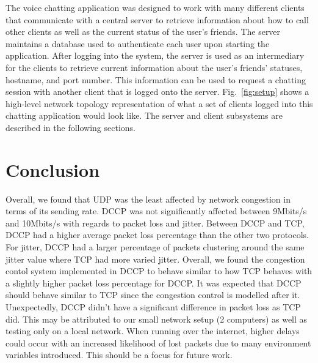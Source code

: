 \documentclass[letterpaper, 9 pt, balance, conference]{ieeeconf}
\begin{document}
The voice chatting application was designed to work with many different clients
that communicate with a central server to retrieve information about how to call
other clients as well as the current status of the user's friends. The server 
maintains a database used to authenticate each user upon starting the application.
After logging into the system, the server is used as an intermediary for the clients
to retrieve current information about the user's friends' statuses, hostname, and
port number. This information can be used to request a chatting session with another
client that is logged onto the server.  Fig.~\ref{fig:setup} shows a high-level
network topology representation of what a set of clients logged into this chatting 
application would look like.  The server and client subsystems are described in
the following sections.







\section{Conclusion}
\label{sec:concl}

Overall, we found that UDP was the least affected by network congestion in terms of its sending rate.  DCCP was not 
significantly affected between 9Mbits/s and 10Mbits/s with regards to packet loss and 
jitter.  Between DCCP and TCP, DCCP had a higher average packet loss 
percentage than the other two protocols.  For jitter, DCCP had a larger percentage
of packets clustering around the same jitter value where TCP had more varied jitter. 
Overall, 
we found the congestion contol system implemented in DCCP to behave similar to how TCP 
behaves with a slightly higher packet loss percentage for DCCP. It was expected that 
DCCP should behave similar to TCP since the congestion control is modelled after it. 
Unexpectedly, DCCP didn't have a significant difference in packet loss as TCP did. 
This may be attributed to our small network setup (2 computers) as well as testing 
only on a local network.  When running over the internet, higher delays could 
occur with an increased likelihood of lost packets due to many environment variables 
introduced.  This should be a focus for future work.

\balance

\end{document}

